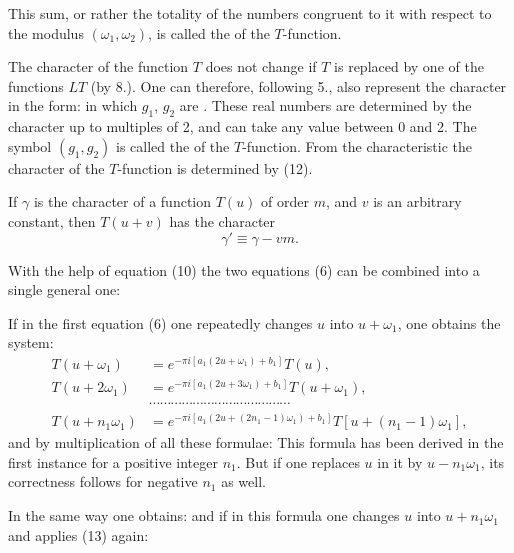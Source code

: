 This sum, or rather the totality of the numbers congruent to it with respect to the modulus $(\omega_1, \omega_2)$, is called the  of the $T$-function.

The character of the function $T$ does not change if $T$ is replaced by one of the functions $LT$ (by 8.). One can therefore, following 5., also represent the character in the form:
in which $g_1$, $g_2$ are . These real numbers are determined by the character up to multiples of 2, and can take any value between 0 and 2. The symbol $(g_1, g_2)$ is called the  of the $T$-function. From the characteristic the character of the $T$-function is determined by (12).

If $\gamma$ is the character of a function $T(u)$ of order $m$, and $v$ is an arbitrary constant, then $T(u+v)$ has the character
\[
\gamma' \equiv \gamma - vm.
\]

With the help of equation (10) the two equations (6) can be combined into a single general one:

If in the first equation (6) one repeatedly changes $u$ into $u + \omega_1$, one obtains the system:
\[
\begin{aligned}
T(u+\omega_1) &= e^{-\pi i[a_1(2u+\omega_1)+b_1]}T(u),\\
T(u+2\omega_1) &= e^{-\pi i[a_1(2u+3\omega_1)+b_1]}T(u+\omega_1),\\
&\cdots\cdots\cdots\cdots\cdots\cdots\cdots\cdots\cdots\cdots\cdots\cdots\cdots\\
T(u+n_1\omega_1) &= e^{-\pi i[a_1(2u+(2n_1-1)\omega_1)+b_1]}T[u+(n_1-1)\omega_1],
\end{aligned}
\]
and by multiplication of all these formulae:
This formula has been derived in the first instance for a positive integer $n_1$. But if one replaces $u$ in it by $u - n_1\omega_1$, its correctness follows for negative $n_1$ as well.

In the same way one obtains:
and if in this formula one changes $u$ into $u + n_1\omega_1$ and applies (13) again:
